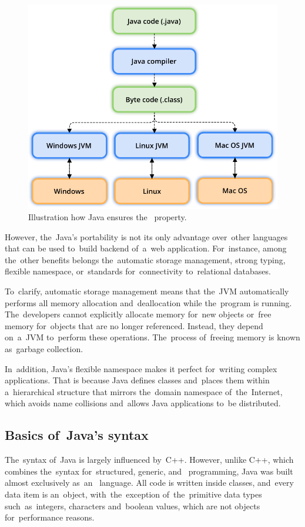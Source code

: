\begin{figure}[!hbt]
	\centering
	\includegraphics[scale=0.7]{./figures/java-jvm.pdf}
	\caption{Illustration how Java ensures the~
	property.}
\end{figure}

However, the~Java's portability is not its only advantage over~other languages
that can be used to~build backend of~a~web application. For~instance, among
the~other benefits belongs the~automatic storage management, strong typing, 
flexible namespace, or~standards for~connectivity to~relational databases.

To~clarify, automatic storage management means that the~JVM automatically
performs all memory allocation and~deallocation while the~program is running.
The~developers cannot explicitly allocate memory for~new objects or~free memory
for~objects that are no longer referenced. Instead, they depend on~a~JVM
to~perform these operations. The~process of~freeing memory is known as~garbage
collection.

In~addition, Java's flexible namespace makes it perfect for~writing complex
applications. That is because Java defines classes and~places them within
a~hierarchical structure that mirrors the~domain namespace of~the~Internet,
which avoids name collisions and~allows Java applications to~be distributed. 



\subsection{Basics of~Java's syntax}
The~syntax of~Java is largely influenced by~C++. However, unlike C++, which
combines the~syntax for~structured, generic, and~
programming, Java was built almost exclusively as~an~
language. All code is written inside classes, and~every data item is an~object,
with~the~exception of~the~primitive data types such~as~integers, characters
and~boolean values, which are not objects for~performance reasons.

